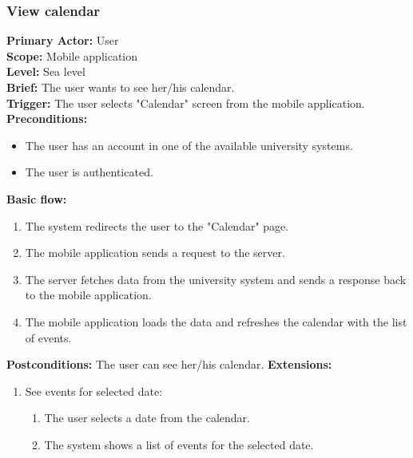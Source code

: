 \subsubsection{\large{View calendar}}
\textbf{Primary Actor:} User\\
\textbf{Scope:} Mobile application\\
\textbf{Level:} Sea level\\
\textbf{Brief:} The user wants to see her/his calendar.\\
\textbf{Trigger:} The user selects "Calendar" screen from the mobile application.\\
\textbf{Preconditions:}
\begin{itemize}
    \item The user has an account in one of the available university systems.
    \item The user is authenticated.
\end{itemize}
\textbf{Basic flow:}
\begin{enumerate}
    \item The system redirects the user to the "Calendar" page.
    \item The mobile application sends a request to the server.
    \item The server fetches data from the university system and sends a response back to the mobile application.
    \item The mobile application loads the data and refreshes the calendar with the list of events.
\end{enumerate}
\textbf{Postconditions:}
The user can see her/his calendar.
\textbf{Extensions:}
\begin{enumerate}[label=\alph*.]
    \item See events for selected date:
    \begin{enumerate}
        \item The user selects a date from the calendar.
        \item The system shows a list of events for the selected date.
    \end{enumerate}
\end{enumerate}


